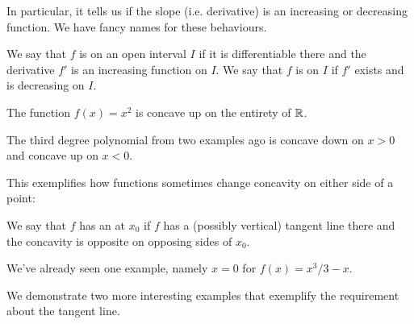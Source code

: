 In particular, it tells us if the slope (i.e. derivative) is an increasing or decreasing function. We have fancy names for these behaviours.

\begin{definition}[Concavity]
	We say that $f$ is  on an open interval $I$ if it is differentiable there and the derivative $f'$ is an increasing function on $I$. We say that $f$ is  on $I$ if $f'$ exists and is decreasing on $I$.
\end{definition}

\begin{example}
	The function $f(x) = x^2$ is concave up on the entirety of $\mathbb{R}$.
\end{example}

\begin{example}
	The third degree polynomial from two examples ago is concave down on $x > 0$ and concave up on $x < 0$.
\end{example}

\noindent
This exemplifies how functions sometimes change concavity on either side of a point:

\begin{definition}
	We say that $f$ has an  at $x_0$ if $f$ has a (possibly vertical) tangent line there and the concavity is opposite on opposing sides of $x_0$.
\end{definition}

\noindent
We've already seen one example, namely $x = 0$ for $f(x) = x^3 / 3 - x$.

We demonstrate two more interesting examples that exemplify the requirement about the tangent line.


